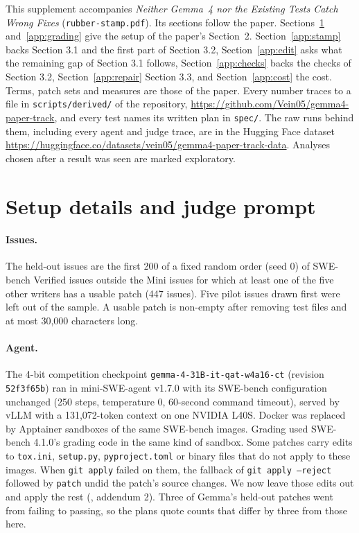 \documentclass[10pt,letterpaper]{article}
\begin{document}
\noindent This supplement accompanies \emph{Neither Gemma~4 nor the Existing Tests Catch Wrong Fixes} (\texttt{rubber-stamp.pdf}). Its sections follow the paper.
Sections~\ref{app:prompt} and~\ref{app:grading} give the setup of the paper's Section~2. Section~\ref{app:stamp} backs
Section 3.1 and the first part of Section 3.2, Section~\ref{app:edit} asks what the remaining gap of Section 3.1 follows, Section~\ref{app:checks}
backs the checks of Section 3.2, Section~\ref{app:repair} Section 3.3, and Section~\ref{app:cost} the cost. Terms, patch sets and measures are those of the paper. Every number traces to
a file in \texttt{scripts/derived/} of the repository, \url{https://github.com/Vein05/gemma4-paper-track}, and every
test names its written plan in \texttt{spec/}. The raw runs behind them, including every agent and judge trace, are in
the Hugging Face dataset \url{https://huggingface.co/datasets/vein05/gemma4-paper-track-data}. Analyses chosen after a result was seen are marked exploratory.

\section{Setup details and judge prompt}
\label{app:prompt}

\paragraph{Issues.} The held-out issues are the first 200 of a fixed random order (seed 0) of SWE-bench Verified issues
outside the Mini issues for which at least one of the five other writers has a usable patch (447 issues). Five pilot
issues drawn first were left out of the sample. A usable patch is non-empty after removing test files and at most
30,000 characters long.

\paragraph{Agent.} The 4-bit competition checkpoint \texttt{gemma-4-31B-it-qat-w4a16-ct} (revision \texttt{52f3f65b}) ran
in mini-SWE-agent v1.7.0 with its SWE-bench configuration unchanged (250 steps, temperature 0, 60-second command
timeout), served by vLLM with a 131,072-token context on one NVIDIA L40S. Docker was replaced by Apptainer sandboxes
of the same SWE-bench images. Grading used SWE-bench 4.1.0's grading code in the same kind of sandbox. Some patches carry edits to \texttt{tox.ini},
\texttt{setup.py}, \texttt{pyproject.toml} or binary files that do not apply to these images. When \texttt{git apply}
failed on them, the fallback of \texttt{git apply --reject} followed by \texttt{patch} undid the patch's source changes. We now
leave those edits out and apply the rest (, addendum 2). Three of Gemma's held-out
patches went from failing to passing, so the plans quote counts that differ by three from those here.
\end{document}
